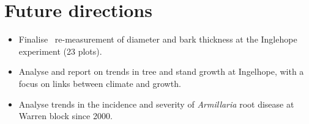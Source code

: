 \documentclass[version=last,
    paper=a4, %
    10pt, %
    usenames,
    dvipsnames,
    oneside, %
    headings=openany, %
    DIV=15 %
]{scrbook}
\begin{document}
\section*{Future directions}
\begin{itemize}
\itemsep1pt\parskip0pt
\item
  Finalise~ re-measurement of diameter and bark thickness at the
  Inglehope experiment (23 plots).
\item
  Analyse and report on trends in tree and stand growth at Ingelhope,
  with a focus on links between climate and growth.
\item
  Analyse trends in the incidence and severity of \emph{Armillaria} root
  disease at Warren block since 2000.
\end{itemize}



\end{document}
